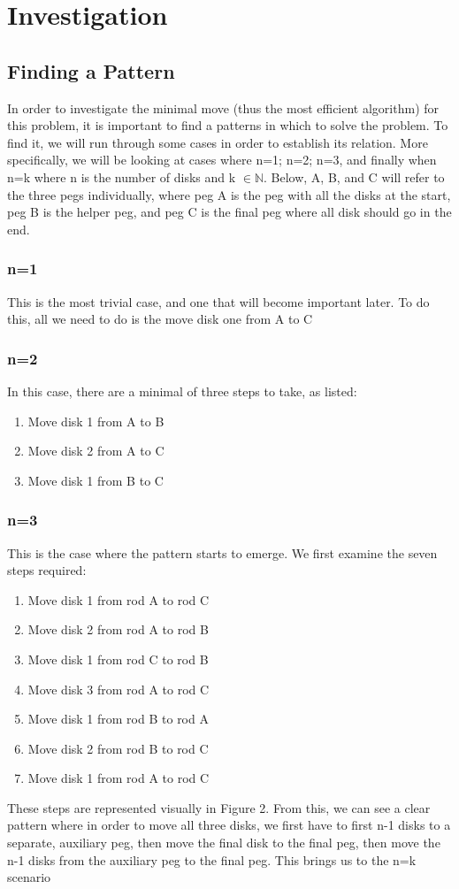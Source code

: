 \documentclass[12pt,a4paper]{article}
\begin{document}
	\section{Investigation}
	\subsection{Finding a Pattern}
	In order to investigate the minimal move (thus the most efficient algorithm) for this problem, it is important to find a patterns in which to solve the problem. To find it, we will run through some cases in order to establish its relation. More specifically, we will be looking at cases where n=1; n=2; n=3, and finally when n=k where n is the number of disks and k $\in \mathbb{N}$. Below, A, B, and C will refer to the three pegs individually, where peg A is the peg with all the disks at the start, peg B is the helper peg, and peg C is the final peg where all disk should go in the end. 
	\subsubsection{n=1}
	This is the most trivial case, and one that will become important later. To do this, all we need to do is the move disk one from A to C
	\subsubsection{n=2}
	In this case, there are a minimal of three steps to take, as listed:
	\begin{enumerate}
		\item Move disk 1 from A to B
		\item Move disk 2 from A to C
		\item Move disk 1 from B to C
	\end{enumerate}
	\subsubsection{n=3}
	This is the case where the pattern starts to emerge. We first examine the seven steps required:
	\begin{enumerate}
		\item Move disk 1 from rod A to rod C
		\item Move disk 2 from rod A to rod B
		\item Move disk 1 from rod C to rod B
		\item Move disk 3 from rod A to rod C
		\item Move disk 1 from rod B to rod A
		\item Move disk 2 from rod B to rod C
		\item Move disk 1 from rod A to rod C
	\end{enumerate}
	These steps are represented visually in Figure 2. From this, we can see a clear pattern where in order to move all three disks, we first have to first n-1 disks to a separate, auxiliary peg, then move the final disk to the final peg, then move the n-1 disks from the auxiliary peg to the final peg. This brings us to the n=k scenario
\end{document}
